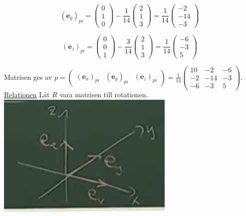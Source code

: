 \begin{equation*}
    (\bm{e}_{y})_{pi}=
    \begin{pmatrix}0\\1\\0\end{pmatrix}-\frac{1}{14}\begin{pmatrix}2\\1\\3\end{pmatrix}=
    \frac{1}{14}\begin{pmatrix}-2\\-14\\-3\end{pmatrix}
\end{equation*}

\begin{equation*}
    (\bm{e}_{z})_{pi}=
    \begin{pmatrix}0\\0\\1\end{pmatrix}-\frac{3}{14}\begin{pmatrix}2\\1\\3\end{pmatrix}=
    \frac{1}{14}\begin{pmatrix}-6\\-3\\5\end{pmatrix}
\end{equation*}

Matrisen ges av $p=\begin{pmatrix}(\bm{e}_{x})_{pi} & (\bm{e}_{y})_{pi} & (\bm{e}_{z})_{pi}\end{pmatrix}=\frac{1}{14}\begin{pmatrix}
    10&-2&-6\\
    -2&-14&-3\\
    -6&-3&5
\end{pmatrix}$.\\

\underline{Relationen} Låt $R$ vara matrisen till rotationen.\\

\includegraphics[scale=0.5]{imgs/img02.png}

